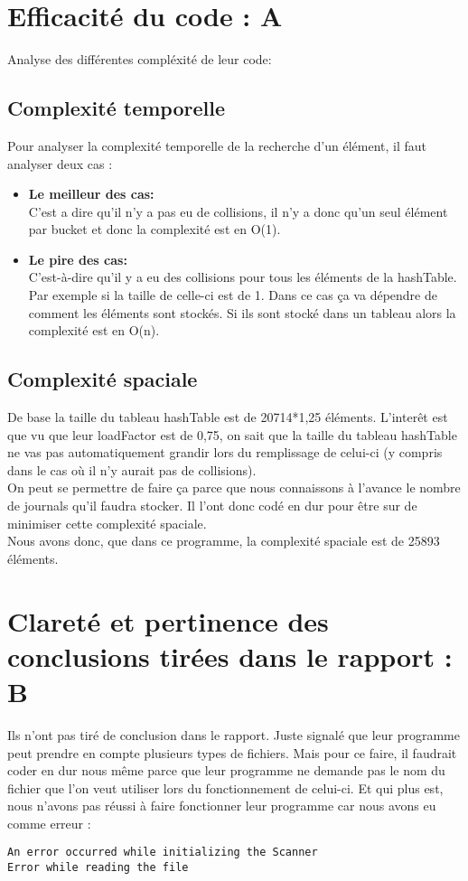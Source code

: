 \documentclass[a4paper]{article}
\begin{document}
\section*{Efficacité du code : A}
Analyse des différentes compléxité de leur code:

\subsection*{Complexité temporelle}

Pour analyser la complexité temporelle de la recherche d'un élément, il faut analyser deux cas :
\begin{itemize}
\item{\textbf{Le meilleur des cas:}}\\
C'est a dire qu'il n'y a pas eu de collisions, il n'y a donc qu'un seul élément par bucket et donc la complexité est en O(1).

\item{\textbf{Le pire des cas:}}\\
C'est-à-dire qu'il y a eu des collisions pour tous les éléments de la hashTable. Par exemple si la taille de celle-ci est de 1.
Dans ce cas ça va dépendre de comment les éléments sont stockés. Si ils sont stocké dans un tableau alors la complexité est en O(n).
\end{itemize}
\subsection*{Complexité spaciale}

De base la taille du tableau hashTable est de 20714*1,25 éléments. L'interêt est que vu que leur loadFactor est de 0,75, on sait que la taille du tableau hashTable ne vas pas automatiquement grandir lors du remplissage de celui-ci (y compris dans le cas où il n'y aurait pas de collisions).\\
On peut se permettre de faire ça parce que nous connaissons à l'avance le nombre de journals qu'il faudra stocker. Il l'ont donc codé en dur pour être sur de minimiser cette complexité spaciale.\\

Nous avons donc, que dans ce programme, la complexité spaciale est de 25893 éléments.

\section*{Clareté et pertinence des conclusions tirées dans le rapport : B}
Ils n'ont pas tiré de conclusion dans le rapport. Juste signalé que leur programme peut prendre en compte plusieurs types de fichiers. Mais pour ce faire, il faudrait coder en dur nous même parce que leur programme ne demande pas le nom du fichier que l'on veut utiliser lors du fonctionnement de celui-ci. Et qui plus est, nous n'avons pas réussi à faire fonctionner leur programme car nous avons eu comme erreur :
\begin{verbatim}
An error occurred while initializing the Scanner
Error while reading the file
\end{verbatim}
\end{document}
